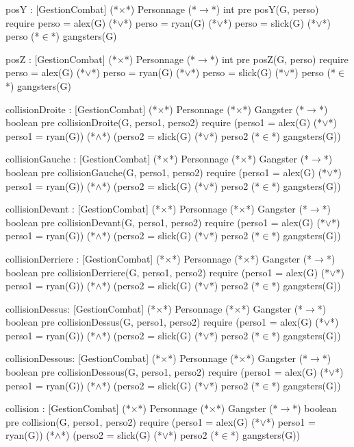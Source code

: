\documentclass[a4paper, 11pt]{report}
\begin{document}
\begin{landscape}
\begin{Spe}
      posY : [GestionCombat] (*$\times$*) Personnage (*$\rightarrow$*) int 
	    pre posY(G, perso) require perso = alex(G) (*$\lor$*) perso = ryan(G) (*$\lor$*) perso = slick(G)  (*$\lor$*) perso (*$\in$*) gangsters(G)
	    
      posZ : [GestionCombat] (*$\times$*) Personnage (*$\rightarrow$*) int
	    pre posZ(G, perso) require perso = alex(G) (*$\lor$*) perso = ryan(G) (*$\lor$*) perso = slick(G)  (*$\lor$*) perso (*$\in$*) gangsters(G)
	    
      collisionDroite : [GestionCombat] (*$\times$*) Personnage (*$\times$*) Gangster (*$\rightarrow$*) boolean
	    pre collisionDroite(G, perso1, perso2) require 
	    (perso1 = alex(G) (*$\lor$*) perso1 = ryan(G)) (*$\land$*) (perso2 = slick(G) (*$\lor$*) perso2 (*$\in$*) gangsters(G))
	    
      collisionGauche : [GestionCombat] (*$\times$*) Personnage (*$\times$*) Gangster (*$\rightarrow$*) boolean
	    pre collisionGauche(G, perso1, perso2) require 
	    (perso1 = alex(G) (*$\lor$*) perso1 = ryan(G)) (*$\land$*) (perso2 = slick(G) (*$\lor$*) perso2 (*$\in$*) gangsters(G))
	    
      collisionDevant : [GestionCombat] (*$\times$*) Personnage (*$\times$*) Gangster (*$\rightarrow$*) boolean
	    pre collisionDevant(G, perso1, perso2) require 
	    (perso1 = alex(G) (*$\lor$*) perso1 = ryan(G)) (*$\land$*) (perso2 = slick(G) (*$\lor$*) perso2 (*$\in$*) gangsters(G))
	    
      collisionDerriere : [GestionCombat] (*$\times$*) Personnage (*$\times$*) Gangster (*$\rightarrow$*) boolean
	    pre collisionDerriere(G, perso1, perso2) require 
	    (perso1 = alex(G) (*$\lor$*) perso1 = ryan(G)) (*$\land$*) (perso2 = slick(G) (*$\lor$*) perso2 (*$\in$*) gangsters(G))
	    
      collisionDessus: [GestionCombat] (*$\times$*) Personnage (*$\times$*) Gangster (*$\rightarrow$*) boolean
	    pre collisionDessus(G, perso1, perso2) require 
	    (perso1 = alex(G) (*$\lor$*) perso1 = ryan(G)) (*$\land$*) (perso2 = slick(G) (*$\lor$*) perso2 (*$\in$*) gangsters(G))
	    
      collisionDessous: [GestionCombat] (*$\times$*) Personnage (*$\times$*) Gangster (*$\rightarrow$*) boolean
	    pre collisionDessous(G, perso1, perso2) require 
	    (perso1 = alex(G) (*$\lor$*) perso1 = ryan(G)) (*$\land$*) (perso2 = slick(G) (*$\lor$*) perso2 (*$\in$*) gangsters(G))
	    
      collision : [GestionCombat] (*$\times$*) Personnage (*$\times$*) Gangster (*$\rightarrow$*) boolean
	    pre collision(G, perso1, perso2) require 
	    (perso1 = alex(G) (*$\lor$*) perso1 = ryan(G)) (*$\land$*) (perso2 = slick(G) (*$\lor$*) perso2 (*$\in$*) gangsters(G))


\end{Spe}
\end{landscape}
\end{document}
